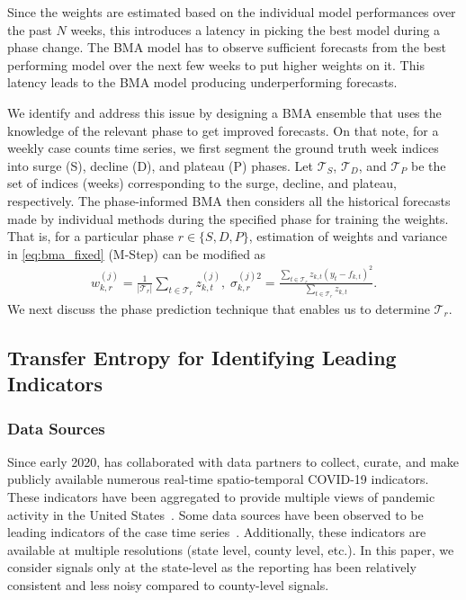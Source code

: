 \documentclass[conference,compsoc]{IEEEtran}
\begin{document}
  Since the weights are estimated based on the individual model performances over the past $N$ weeks, this introduces a latency in picking the best model during a phase change. The BMA model has to observe sufficient forecasts from the best performing model over the next few weeks to put higher weights on it. This latency leads to the BMA model producing underperforming forecasts.
 
We identify and address this issue by designing a BMA ensemble that uses the knowledge of the relevant phase to get improved forecasts. On that note, for a weekly case counts time series, we first segment the ground truth week indices into surge (S), decline (D), and plateau (P) phases. Let $\mathcal{T}_S$, $\mathcal{T}_D$, and $\mathcal{T}_P$ be the set of  indices (weeks) corresponding to the surge, decline, and plateau, respectively. The phase-informed BMA then considers all the historical forecasts made by individual methods during the specified phase for training the weights. That is, for a particular phase $r \in \{S,D,P\}$, estimation of weights and variance in \eqref{eq:bma_fixed} (M-Step) can be modified as
\begin{eqnarray}
    w^{(j)}_{k,r} = \frac{1}{|\mathcal{T}_r|} \sum_{t \in \mathcal{T}_r} z_{k,t}^{(j)}, \;
    \sigma^{(j)2}_{k,r} = \frac{\sum_{t \in \mathcal{T}_r}z_{k,t}(y_t-f_{k,t})^2}{\sum_{t \in \mathcal{T}_r}z_{k,t}  }.
\end{eqnarray}
We next discuss the phase prediction technique that enables us to determine $\mathcal{T}_r$.

\subsection{Transfer Entropy for Identifying Leading Indicators} \label{subsec:phase.pred}

\subsubsection{Data Sources} \label{sec:data-src}
Since early 2020, \cite{covidcast} has collaborated with data partners to collect, curate, and make publicly available numerous real-time spatio-temporal COVID-19 indicators. These indicators have been aggregated to provide multiple views of pandemic activity in the United States~\cite{reinhart2021open}. Some data sources have been observed to be leading indicators of the case time series~\cite{mcdonald2021can}. Additionally, these indicators are available at multiple resolutions (state level, county level, etc.). In this paper, we consider signals only at the state-level as the reporting has been relatively consistent and less noisy compared to county-level signals.
\end{document}
